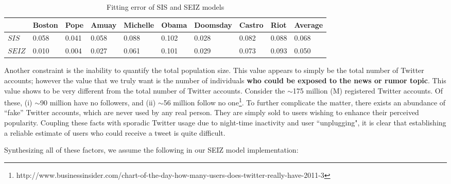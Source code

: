 \begin{table}[th]
\tiny
\caption{Fitting error of SIS and SEIZ models}
\vspace{0.5em}
\centering
\begin{tabular}{| p{0.8cm}| p{1.2cm}| p{1cm} | p{1cm}| p{1.2cm} | p{1.3cm} | p{1.5cm} | p{1.2cm} | p{1.2cm}| p{1.3cm}| }
\hline
&\textbf{Boston}& \textbf{Pope} & \textbf{Amuay} & \textbf{Michelle} & \textbf{Obama} &\textbf{Doomsday} &\textbf{Castro}& \textbf{Riot}& \textbf{Average}   \\ [1ex]
\hline
\textbf{$SIS$} & 0.058 &0.041 & 0.058 & 0.088 & 0.102 & 0.028 & 0.082 & 0.088 & 0.068\\[1ex]
\hline
\textbf{$SEIZ$} & 0.010 & 0.004 &0.027 & 0.061 &0.101 & 0.029 & 0.073 & 0.093 & 0.050 \\[1ex]
\hline
\end{tabular}
\label{table:error} %
\end{table}


Another constraint is the inability to quantify the total population size. This value appears to simply be the total number of Twitter accounts; however the value that we truly want is the number of individuals {\bf who could be exposed to the news or rumor topic}. This value shows to be very different from the total number of Twitter accounts. Consider the $\sim$175 million (M) registered Twitter accounts. Of these, (i) $\sim$90 million have no followers, and (ii) $\sim$56 million follow no one\footnote{http://www.businessinsider.com/chart-of-the-day-how-many-users-does-twitter-really-have-2011-3}. To further complicate the matter, there exists an abundance of
``fake'' Twitter accounts, which are never used by any real person. They are simply sold to users wishing to enhance their perceived popularity. Coupling these facts with sporadic Twitter usage due to night-time inactivity and user ``unplugging", it is clear that establishing a reliable estimate of users who could receive a tweet is quite difficult.

Synthesizing all of these factors, we assume the following in our SEIZ model implementation:

